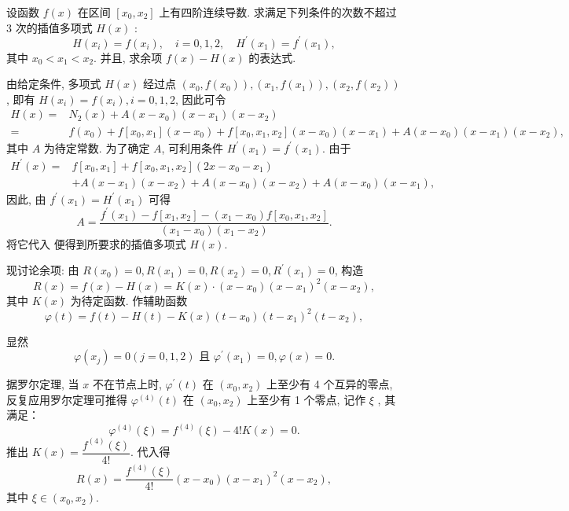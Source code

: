   \begin{tcolorbox}[enhanced,colback=10,colframe=9,breakable,coltitle=green!25!black,title=2024]
  

设函数 $ f(x) $ 在区间 $ \left[x_{0}, x_{2}\right] $ 上有四阶连续导数. 求满足下列条件的次数不超过 3 次的插值多项式 $ H(x) $ :
$$
H\left(x_{i}\right)=f\left(x_{i}\right), \quad i=0,1,2, \quad H^{\prime}\left(x_{1}\right)=f^{\prime}\left(x_{1}\right),
$$
其中 $ x_{0}<x_{1}<x_{2} $. 并且, 求余项 $ f(x)-H(x) $ 的表达式.
 \tcblower

 由给定条件, 多项式 $ H(x) $ 经过点 $ \left(x_{0}, f\left(x_{0}\right)\right),\left(x_{1}, f\left(x_{1}\right)\right),\left(x_{2}, f\left(x_{2}\right)\right) $, 即有 $ H\left(x_{i}\right)=f\left(x_{i}\right), i=0,1,2 $, 因此可令
$$
\begin{aligned}
H(x)= & N_{2}(x)+A\left(x-x_{0}\right)\left(x-x_{1}\right)\left(x-x_{2}\right) \\
= & f\left(x_{0}\right)+f\left[x_{0}, x_{1}\right]\left(x-x_{0}\right)+f\left[x_{0}, x_{1}, x_{2}\right]\left(x-x_{0}\right)\left(x-x_{1}\right)  +A\left(x-x_{0}\right)\left(x-x_{1}\right)\left(x-x_{2}\right),
\end{aligned}
$$
其中 $ A $ 为待定常数. 为了确定 $ A $, 可利用条件 $ H^{\prime}\left(x_{1}\right)=f^{\prime}\left(x_{1}\right) $. 由于
$$
\begin{aligned}
H^{\prime}(x)= & f\left[x_{0}, x_{1}\right]+f\left[x_{0}, x_{1}, x_{2}\right]\left(2 x-x_{0}-x_{1}\right) \\
& +A\left(x-x_{1}\right)\left(x-x_{2}\right)+A\left(x-x_{0}\right)\left(x-x_{2}\right)+A\left(x-x_{0}\right)\left(x-x_{1}\right),
\end{aligned}
$$
因此, 由 $ f^{\prime}\left(x_{1}\right)=H^{\prime}\left(x_{1}\right) $ 可得
$$
A=\frac{f^{\prime}\left(x_{1}\right)-f\left[x_{1}, x_{2}\right]-\left(x_{1}-x_{0}\right) f\left[x_{0}, x_{1}, x_{2}\right]}{\left(x_{1}-x_{0}\right)\left(x_{1}-x_{2}\right)} .
$$
将它代入 便得到所要求的插值多项式 $ H(x) $.

现讨论余项: 由 $ R\left(x_{0}\right)=0, R\left(x_{1}\right)=0, R\left(x_{2}\right)=0, R^{\prime}\left(x_{1}\right)=0 $, 构造
$$
R(x)=f(x)-H(x)=K(x) \cdot\left(x-x_{0}\right)\left(x-x_{1}\right)^{2}\left(x-x_{2}\right),
$$
其中 $ K(x) $ 为待定函数. 作辅助函数
$$
\varphi(t)=f(t)-H(t)-K(x)\left(t-x_{0}\right)\left(t-x_{1}\right)^{2}\left(t-x_{2}\right),
$$

显然
$$
\varphi\left(x_{j}\right)=0(j=0,1,2) \text { 且 } \varphi^{\prime}\left(x_{1}\right)=0, \varphi(x)=0 .
$$

据罗尔定理, 当 $ x $ 不在节点上时, $ \varphi^{\prime}(t) $ 在 $ \left(x_{0}, x_{2}\right) $ 上至少有 4 个互异的零点, 反复应用罗尔定理可推得 $ \varphi^{(4)}(t) $ 在 $ \left(x_{0}, x_{2}\right) $ 上至少有 1 个零点, 记作 $ \xi$ , 其满足：
$$
\varphi^{(4)}(\xi)=f^{(4)}(\xi)-4 ! K(x)=0 .
$$
推出 $ K(x)=\dfrac{f^{(4)}(\xi)}{4 !} $. 代入得
$$
R(x)=\frac{f^{(4)}(\xi)}{4 !}\left(x-x_{0}\right)\left(x-x_{1}\right)^{2}\left(x-x_{2}\right),
$$
其中 $ \xi \in\left(x_{0}, x_{2}\right) $.

\end{tcolorbox}

